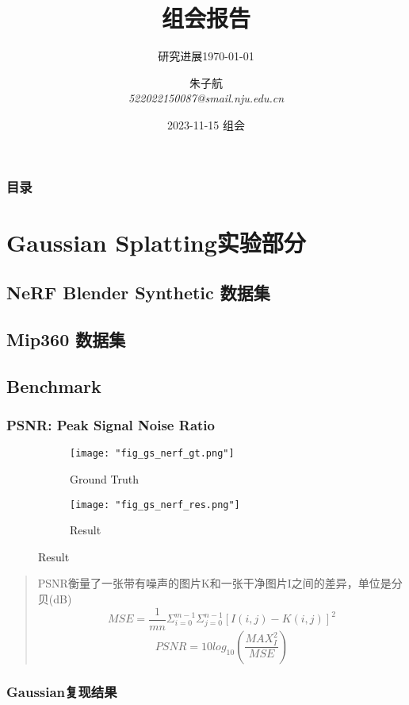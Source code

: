 \documentclass{njupre/njupre}
\title[组会]{组会报告}
\subtitle{研究进展\today}
\author[朱子航]{\texorpdfstring{朱子航 \\ \smallskip \textit{522022150087@smail.nju.edu.cn}}{}}
\date[2023-11-15]{\texorpdfstring{2023-11-15 组会}{}}
\begin{document}
\begin{frame}
    \titlepage
\end{frame}
\begin{frame}
    \frametitle{目录}
    \tableofcontents
\end{frame}
\section{Gaussian Splatting实验部分}
\subsection{NeRF Blender Synthetic 数据集}

\subsection{Mip360 数据集}

\subsection{Benchmark}
\begin{frame}
\frametitle{PSNR: Peak Signal Noise Ratio}

\begin{figure}
    \centering
    \begin{subfigure}{0.25\linewidth}
        \texttt{[image: "fig\_gs\_nerf\_gt.png"]}
        \caption{Ground Truth}
    \end{subfigure}
    \begin{subfigure}{0.25\linewidth}
        \texttt{[image: "fig\_gs\_nerf\_res.png"]}
        \caption{Result}
    \end{subfigure}
\end{figure}

\begin{quote}
    PSNR衡量了一张带有噪声的图片K和一张干净图片I之间的差异，单位是分贝(dB)
    $$MSE = \frac{1}{mn}\Sigma_{i=0}^{m-1}\Sigma_{j=0}^{n-1}[I(i,j) - K(i,j)]^2$$
    $$PSNR = 10 log_{10}(\frac{MAX_I^2}{MSE})$$ 
\end{quote}
\end{frame}

\begin{frame}
\frametitle{Gaussian复现结果}
\begin{table}
    
\end{table}
\end{frame}
\end{document}
